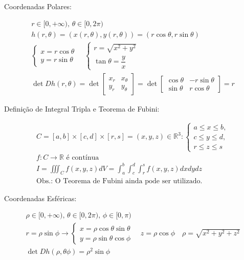 	\begin{large}
	
	Coordenadas Polares:
	\end{large}
	\begin{gather*}
	r\in[0,+\infty), \,\theta\in[0,2\pi)\\
	h(r,\theta) = (x(r,\theta),y(r,\theta))=(r\cos\theta,r\sin\theta)\\
	\begin{cases}
	x=r\cos\theta \\
	y=r\sin\theta	
	\end{cases}\hspace{12pt}
	\begin{cases}
	r=\sqrt{x^2+y^2}\\
	\tan\theta=\dfrac{y}{x}	
	\end{cases}\\
	\det Dh(r,\theta)=\det\begin{bmatrix}
	x_r & x_\theta \\
	y_r & y_\theta
	\end{bmatrix}=\det\begin{bmatrix}
	\cos\theta & -r\sin\theta \\
	\sin\theta & r\cos\theta
	\end{bmatrix} = r
	\end{gather*}
	
	\begin{large}
	Definição de Integral Tripla e Teorema de Fubini:
	\end{large}		
	\begin{gather*}
	\mathit{C}=[a,b]\times [c,d] \times [r,s] = (x,y,z)\in\mathbb{R}^3: \begin{cases} a\leq x\leq b, \\ c \leq y\leq d, \\ r\leq z\leq s
	\end{cases}	\\
	f:\textit{C}\to\mathbb{R} \text{ é contínua}\\
	I=\displaystyle\iiint_{\mathit{C}}f(x,y,z)dV=\displaystyle\int_a^b\displaystyle\int_c^d
	\displaystyle\int_r^sf(x,y,z)dxdydz \\
	\text{Obs.: O Teorema de Fubini ainda pode ser utilizado.}
	\end{gather*}

	\begin{large}
	Coordenadas Esféricas:
	\end{large}
	\begin{gather*}
	\rho\in[0,+\infty), \,\theta\in[0,2\pi), \, \phi\in[0,\pi)\\
	r=\rho\sin\phi \rightarrow	
	\begin{cases}
	x=\rho\cos\theta\sin\theta \\
	y=\rho\sin\theta\cos\phi	
	\end{cases}\hspace{12pt}
	z=\rho\cos\phi \hspace{12pt} \rho=\sqrt{x^2+y^2+z^2}\\
	\det Dh(\rho,\theta\phi)= \rho^2\sin\phi
	\end{gather*}
	
